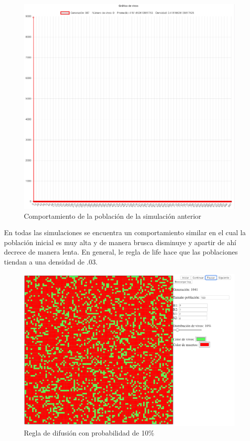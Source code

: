	\begin{figure}[H]
		\begin{center}
			\includegraphics[scale=.24]{GOL/img/life90-2.png}
			\caption{Comportamiento de la población de la simulación anterior}
			\label{fig:gol5}
		\end{center}
	\end{figure}

	En todas las simulaciones se encuentra un comportamiento similar en el cual la población inicial es muy alta y de manera brusca disminuye y apartir de ahí decrece de manera lenta. En general, le regla de life hace que las poblaciones tiendan a una densidad de .03.

	\begin{figure}[H]
		\begin{center}
			\includegraphics[scale=.3]{GOL/img/dif10-1.png}
			\caption{Regla de difusión con probabilidad de 10\%}
			\label{fig:gol5}
		\end{center}
	\end{figure}

